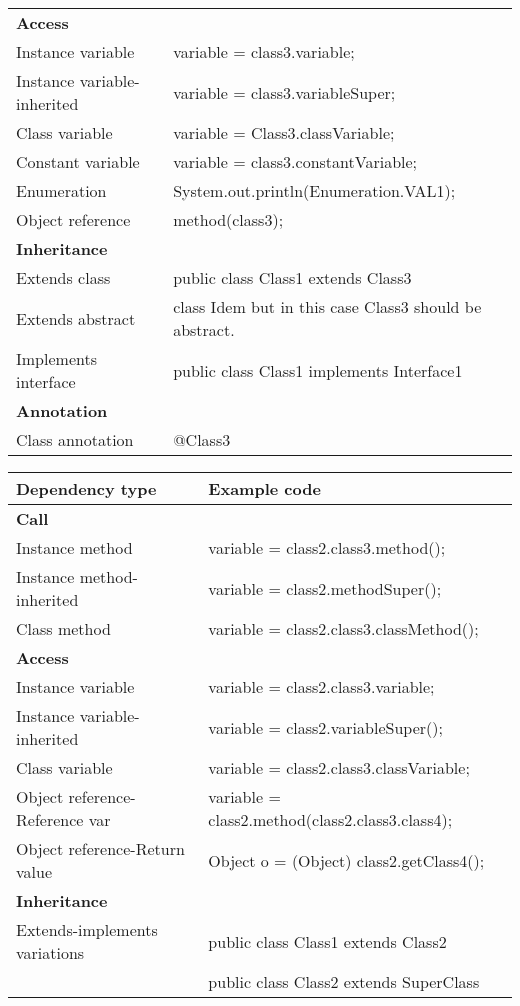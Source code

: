 \begin{center}
\begin{tabular}{|l l|}
        \hline
        \textbf{Access} &  \\
        Instance variable & variable = class3.variable; \\
        Instance variable-inherited & variable = class3.variableSuper; \\
        Class variable & variable = Class3.classVariable; \\
        Constant variable & variable = class3.constantVariable; \\
        Enumeration & System.out.println(Enumeration.VAL1); \\
        Object reference & method(class3); \\
        \hline
        \textbf{Inheritance} &  \\
        Extends class & public class Class1 extends Class3 { } \\
        Extends abstract & class Idem but in this case Class3 should be abstract. \\
        Implements interface & public class Class1 implements Interface1 { } \\
        \hline
        \textbf{Annotation} &  \\
        Class annotation & @Class3 \\
        \hline
    \end{tabular}
\end{center}

\begin{center}
    \begin{tabular}{|l l|}
        \hline
        Dependency type & Example code \\
        \hline
        \textbf{Call} &  \\
        Instance method & variable = class2.class3.method(); \\
        Instance method-inherited & variable = class2.methodSuper(); \\
        Class method & variable = class2.class3.classMethod(); \\
        \hline
        \textbf{Access} &  \\
        Instance variable & variable = class2.class3.variable; \\
        Instance variable-inherited & variable = class2.variableSuper(); \\
        Class variable & variable = class2.class3.classVariable; \\
        Object reference-Reference var & variable = class2.method(class2.class3.class4); \\
        Object reference-Return value & Object o = (Object) class2.getClass4(); \\
        \hline
        \textbf{Inheritance} &  \\
        Extends-implements variations & public class Class1 extends Class2 { } \\
         & public class Class2 extends SuperClass { } \\
        \hline
    \end{tabular}
\end{center}

